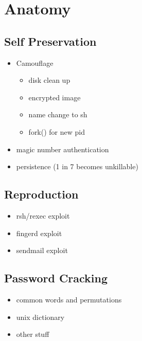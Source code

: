 \section*{Anatomy}


\subsection*{Self Preservation}
    	\begin{itemize}
        	\item Camouflage
            	\begin{itemize}
        		\item disk clean up
                \item encrypted image
                \item name change to sh
                \item fork() for new pid
            	\end{itemize}
            \item magic number authentication
            \item persistence (1 in 7 becomes unkillable)
        \end{itemize}

\subsection*{Reproduction}
		\begin{itemize}
		\item rsh/rexec exploit
 	    \item fingerd exploit
 	    \item sendmail exploit
		\end{itemize}

\subsection*{Password Cracking}
    	\begin{itemize}
    	\item common words and permutations
        \item unix dictionary
        \item other stuff
    	\end{itemize}

